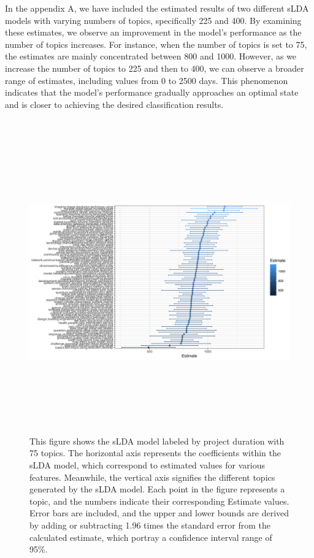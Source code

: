 \documentclass[12pt,twoside]{article}
\begin{document}
In the appendix A, we have included the estimated results of two different sLDA models with varying numbers of topics, specifically 225 and 400. By examining these estimates, we observe an improvement in the model's performance as the number of topics increases. For instance, when the number of topics is set to 75, the estimates are mainly concentrated between 800 and 1000. However, as we increase the number of topics to 225 and then to 400, we can observe a broader range of estimates, including values from 0 to 2500 days. This phenomenon indicates that the model's performance gradually approaches an optimal state and is closer to achieving the desired classification results.\\\\

\begin{figure}[H]
    \hspace{-1cm}
    \includegraphics[width=18cm,height=13cm]{./figures/75-Duration}
    \caption{This figure shows the sLDA model labeled by project duration with 75 topics. The horizontal axis represents the coefficients within the sLDA model, which correspond to estimated values for various features. Meanwhile, the vertical axis signifies the different topics generated by the sLDA model. Each point in the figure represents a topic, and the numbers indicate their corresponding Estimate values. Error bars are included, and the upper and lower bounds are derived by adding or subtracting 1.96 times the standard error from the calculated estimate, which portray a confidence interval range of 95\%. }

\end{figure}
\end{document}
